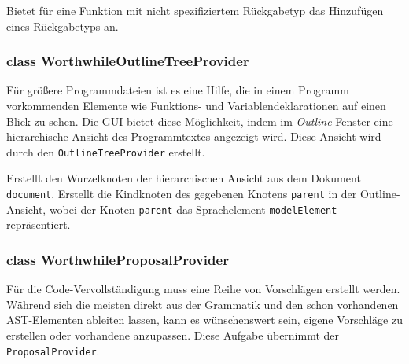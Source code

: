 \begin{description}
	 Bietet für eine Funktion mit nicht spezifiziertem Rückgabetyp das Hinzufügen eines Rückgabetyps an.
\end{description}

\subsubsection{class WorthwhileOutlineTreeProvider}

Für größere Programmdateien ist es eine Hilfe, die in einem Programm vorkommenden Elemente wie Funktions- und Variablendeklarationen auf einen Blick zu sehen. Die GUI bietet diese Möglichkeit, indem im \textit{Outline}-Fenster eine hierarchische Ansicht des Programmtextes angezeigt wird. Diese Ansicht wird durch den \texttt{OutlineTreeProvider} erstellt.

\begin{description}
	 Erstellt den Wurzelknoten der hierarchischen Ansicht aus dem Dokument \texttt{document}.
	 Erstellt die Kindknoten des gegebenen Knotens \texttt{parent} in der Outline-Ansicht, wobei der Knoten \texttt{parent} das Sprachelement \texttt{modelElement} repräsentiert.
\end{description}

\subsubsection{class WorthwhileProposalProvider}

Für die Code-Vervollständigung muss eine Reihe von Vorschlägen erstellt werden. Während sich die meisten direkt aus der Grammatik und den schon vorhandenen AST-Elementen ableiten lassen, kann es wünschenswert sein, eigene Vorschläge zu erstellen oder vorhandene anzupassen. Diese Aufgabe übernimmt der \texttt{ProposalProvider}.

